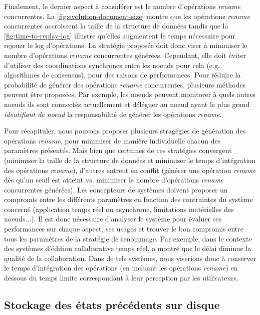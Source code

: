 \documentclass[12pt]{thesul}
\newcommand{\eg}{e.g. }
\begin{document}
Finalement, le dernier aspect à considérer est le nombre d'opérations \emph{rename} concurrentes.
La \autoref{fig:evolution-document-size} montre que les opérations \emph{rename} concurrentes accroissent la taille de la structure de données tandis que la \autoref{fig:time-to-replay-log} illustre qu'elles augmentent le temps nécessaire pour rejouer le log d'opérations.
La stratégie proposée doit donc viser à minimiser le nombre d'opérations \emph{rename} concurrentes générées.
Cependant, elle doit éviter d'utiliser des coordinations synchrones entre les noeuds pour cela (\eg algorithmes de consensus), pour des raisons de performances.
Pour réduire la probabilité de générer des opérations \emph{rename} concurrentes, plusieurs méthodes peuvent être proposées.
Par exemple, les noeuds peuvent monitorer à quels autres noeuds ils sont connectés actuellement et déléguer au noeud ayant le plus grand \emph{identifiant de noeud} la responsabilité de générer les opérations \emph{rename}.

Pour récapituler, nous pouvons proposer plusieurs stragégies de génération des opérations \emph{rename}, pour minimiser de manière individuelle chacun des paramètres présentés.
Mais bien que certaines de ces stratégies convergent (minimiser la taille de la structure de données et minimiser le temps d'intégration des opérations \emph{rename}), d'autres entrent en conflit (générer une opération \emph{rename} dès qu'un seuil est atteint vs. minimiser le nombre d'opérations \emph{rename} concurrentes générées).
Les concepteurs de systèmes doivent proposer un compromis entre les différents paramètres en fonction des contraintes du système concerné (application temps réel ou asynchrone, limitations matérielles des noeuds...).
Il est donc nécessaire d'analyser le système pour évaluer ses performances sur chaque aspect, ses usages et trouver le bon compromis entre tous les paramètres de la stratégie de renommage.
Par exemple, dans le contexte des systèmes d'édition collaborative temps réel, \cite{2014-effect-delay-collaborative-editing-ignat} a montré que le délai diminue la qualité de la collaboration.
Dans de tels systèmes, nous viserions donc à conserver le temps d'intégration des opérations (en incluant les opérations \emph{rename}) en dessous du temps limite correspondant à leur perception par les utilisateurs.

\subsection{Stockage des états précédents sur disque}
\end{document}
